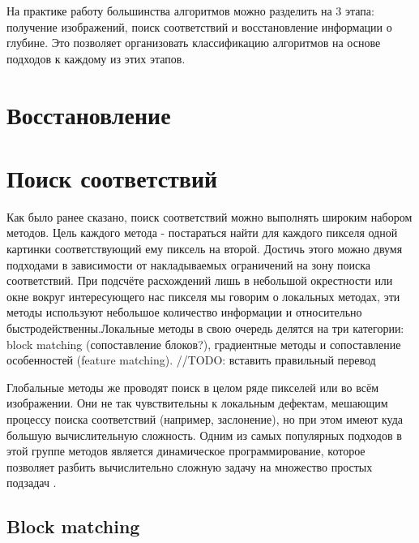 На практике работу большинства алгоритмов можно разделить на 3 этапа: получение изображений, поиск соответствий и восстановление информации о глубине. Это позволяет
организовать классификацию алгоритмов на основе подходов к каждому из этих этапов. 

\section{Восстановление}

\section{Поиск соответствий}

Как было ранее сказано, поиск соответствий можно выполнять широким набором методов. Цель каждого метода - постараться найти для каждого пикселя одной картинки 
соответствующий ему пиксель на второй. Достичь этого можно двумя подходами в зависимости от накладываемых ограничений на зону поиска соответствий.  При подсчёте 
расхождений лишь в небольшой окрестности или окне вокруг интересующего нас пикселя мы говорим о локальных методах, эти методы  используют небольшое количество 
информации и относительно быстродейственны.Локальные методы в свою очередь делятся на три категории: block matching (сопоставление блоков?), градиентные методы и 
сопоставление особенностей (feature matching). 		//TODO: вставить правильный перевод

Глобальные методы же проводят поиск в целом ряде пикселей или во всём изображении. Они не так чувствительны к локальным дефектам, мешающим процессу поиска соответствий 
(например, заслонение), но при этом имеют куда большую вычислительную сложность. Одним из самых популярных подходов в этой группе методов является динамическое программирование, 
которое позволяет разбить вычислительно сложную задачу на множество простых подзадач \cite{dynamic_prog}.   	 

\subsection{Block matching}


